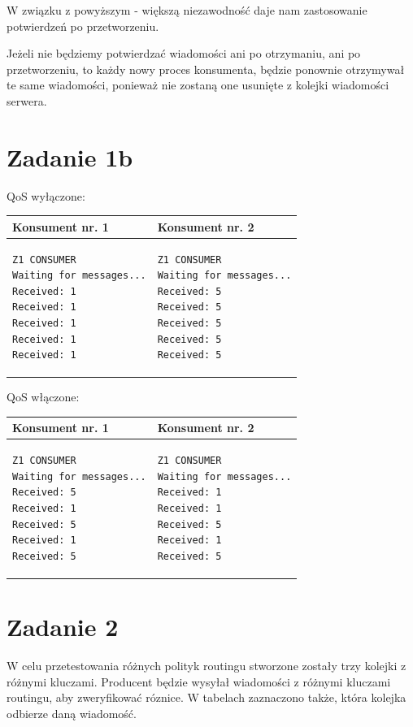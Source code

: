 \documentclass[12pt]{article}
\begin{document}
W związku z powyższym - większą niezawodność daje nam zastosowanie potwierdzeń po przetworzeniu.

Jeżeli nie będziemy potwierdzać wiadomości ani po otrzymaniu, ani po przetworzeniu, to każdy nowy proces konsumenta, będzie ponownie otrzymywał te same wiadomości, ponieważ nie zostaną one usunięte z kolejki wiadomości serwera.


\section{Zadanie 1b}
QoS wyłączone: \\

\begin{tabular}{| p{7cm} | p{7cm} |}
\hline
Konsument nr. 1 & Konsument nr. 2 \\
\hline
\begin{verbatim}
Z1 CONSUMER
Waiting for messages...
Received: 1
Received: 1
Received: 1
Received: 1
Received: 1
\end{verbatim}
& \begin{verbatim}
Z1 CONSUMER
Waiting for messages...
Received: 5
Received: 5
Received: 5
Received: 5
Received: 5
\end{verbatim} 
\\
\hline
\end{tabular}


\vspace{0.7cm}
QoS włączone: \\

\begin{tabular}{| p{7cm} | p{7cm} |}
\hline
Konsument nr. 1 & Konsument nr. 2 \\
\hline
\begin{verbatim}
Z1 CONSUMER
Waiting for messages...
Received: 5
Received: 1
Received: 5
Received: 1
Received: 5
\end{verbatim}
& \begin{verbatim}
Z1 CONSUMER
Waiting for messages...
Received: 1
Received: 1
Received: 5
Received: 1
Received: 5
\end{verbatim} 
\\
\hline
\end{tabular}
\vspace{1cm}

\section{Zadanie 2}

W celu przetestowania różnych polityk routingu stworzone zostały trzy kolejki z różnymi kluczami. Producent będzie wysyłał wiadomości z różnymi kluczami routingu, aby zweryfikować róznice. W tabelach zaznaczono także, która kolejka odbierze daną wiadomość.
\end{document}
